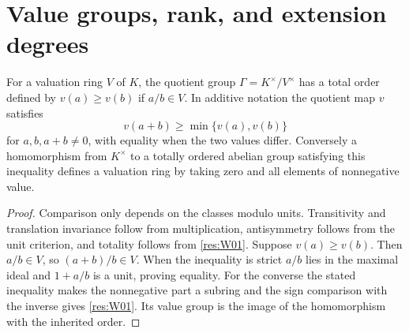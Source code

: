 \section[Value groups and rank]{Value groups, rank, and extension degrees}

\begin{proposition}\label{res:W04}
For a valuation ring \(V\) of \(K\), the quotient group \(\Gamma=K^\times/V^\times\) has a total order defined by \(v(a)\ge v(b)\) if \(a/b\in V\). In additive notation the quotient map \(v\) satisfies
\[
                  v(a+b)\ge\min\{v(a),v(b)\}
\]
for \(a,b,a+b\ne0\), with equality when the two values differ. Conversely a homomorphism from \(K^\times\) to a totally ordered abelian group satisfying this inequality defines a valuation ring by taking zero and all elements of nonnegative value.
\end{proposition}
\begin{proof}
Comparison only depends on the classes modulo units. Transitivity and translation invariance follow from multiplication, antisymmetry follows from the unit criterion, and totality follows from \ref{res:W01}. Suppose \(v(a)\ge v(b)\). Then \(a/b\in V\), so \((a+b)/b\in V\). When the inequality is strict \(a/b\) lies in the maximal ideal and \(1+a/b\) is a unit, proving equality. For the converse the stated inequality makes the nonnegative part a subring and the sign comparison with the inverse gives \ref{res:W01}. Its value group is the image of the homomorphism with the inherited order.
\end{proof}

